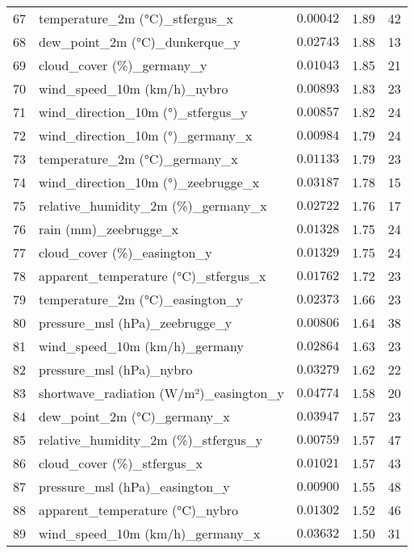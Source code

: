 \begin{table}[H]
\begin{tabular}{r l l l l}
        67 & temperature\_2m (°C)\_stfergus\_x & $0.00042$ & 1.89 & 42 \\
        68 & dew\_point\_2m (°C)\_dunkerque\_y & $0.02743$ & 1.88 & 13 \\
        69 & cloud\_cover (\%)\_germany\_y & $0.01043$ & 1.85 & 21 \\
        70 & wind\_speed\_10m (km/h)\_nybro & $0.00893$ & 1.83 & 23 \\
        71 & wind\_direction\_10m (°)\_stfergus\_y & $0.00857$ & 1.82 & 24 \\
        72 & wind\_direction\_10m (°)\_germany\_x & $0.00984$ & 1.79 & 24 \\
        73 & temperature\_2m (°C)\_germany\_x & $0.01133$ & 1.79 & 23 \\
        74 & wind\_direction\_10m (°)\_zeebrugge\_x & $0.03187$ & 1.78 & 15 \\
        75 & relative\_humidity\_2m (\%)\_germany\_x & $0.02722$ & 1.76 & 17 \\
        76 & rain (mm)\_zeebrugge\_x & $0.01328$ & 1.75 & 24 \\
        77 & cloud\_cover (\%)\_easington\_y & $0.01329$ & 1.75 & 24 \\
        78 & apparent\_temperature (°C)\_stfergus\_x & $0.01762$ & 1.72 & 23 \\
        79 & temperature\_2m (°C)\_easington\_y & $0.02373$ & 1.66 & 23 \\
        80 & pressure\_msl (hPa)\_zeebrugge\_y & $0.00806$ & 1.64 & 38 \\
        81 & wind\_speed\_10m (km/h)\_germany & $0.02864$ & 1.63 & 23 \\
        82 & pressure\_msl (hPa)\_nybro & $0.03279$ & 1.62 & 22 \\
        83 & shortwave\_radiation (W/m²)\_easington\_y & $0.04774$ & 1.58 & 20 \\
        84 & dew\_point\_2m (°C)\_germany\_x & $0.03947$ & 1.57 & 23 \\
        85 & relative\_humidity\_2m (\%)\_stfergus\_y & $0.00759$ & 1.57 & 47 \\
        86 & cloud\_cover (\%)\_stfergus\_x & $0.01021$ & 1.57 & 43 \\
        87 & pressure\_msl (hPa)\_easington\_y & $0.00900$ & 1.55 & 48 \\
        88 & apparent\_temperature (°C)\_nybro & $0.01302$ & 1.52 & 46 \\
        89 & wind\_speed\_10m (km/h)\_germany\_x & $0.03632$ & 1.50 & 31 \\

\end{tabular}
\end{table}

